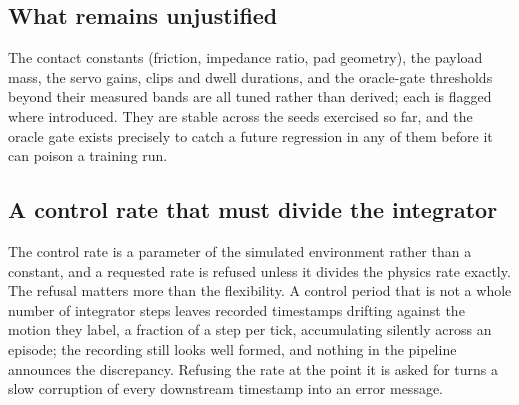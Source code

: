 \subsection{What remains unjustified}
\label{sec:diff-unjustified}

The contact constants (friction, impedance ratio, pad geometry), the
payload mass, the servo gains, clips and dwell durations, and the
oracle-gate thresholds beyond their measured bands are all tuned rather
than derived; each is flagged where introduced. They are stable across
the seeds exercised so far, and the oracle gate exists precisely to
catch a future regression in any of them before it can poison a
training run.

\subsection{A control rate that must divide the integrator}
\label{sec:diff-rate}
The control rate is a parameter of the simulated environment rather than
a constant, and a requested rate is refused unless it divides the
physics rate exactly. The refusal matters more than the flexibility. A
control period that is not a whole number of integrator steps leaves
recorded timestamps drifting against the motion they label, a fraction
of a step per tick, accumulating silently across an episode; the
recording still looks well formed, and nothing in the pipeline
announces the discrepancy. Refusing the rate at the point it is asked
for turns a slow corruption of every downstream timestamp into an error
message.
